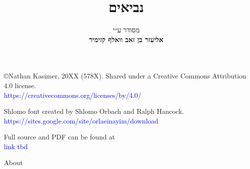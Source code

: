 \documentclass[twoside, openany, parskip=half, 11pt]{book}
\begin{document}
	
	\title{  נביאים \\
		
		\vspace{.5in}
	}
	
	\author{מסודר ע״י
		\\
		\textbf{אליעזר בן זאב וואלף קזימיר}}
	
	\maketitle
	
	\begin{minipage}{\textwidth}
		\begin{english}
			\raggedright
			
			©Nathan Kasimer, 20XX (578X). Shared under a Creative Commons Attribution 4.0 license.\\
			\textcolor{blue}{https://creativecommons.org/licenses/by/4.0/}\\ \vspace{\baselineskip}
			
			
			Shlomo font created by Shlomo Orbach and Ralph Hancock.\\ \textcolor{blue}{https://sites.google.com/site/orlaeinayim/download}\\ \vspace{\baselineskip}
			
			Full \XeLaTeX \quad source and PDF can be found at\\ \textcolor{blue}{link tbd}\\ \vspace{\baselineskip}
			
			
		\end{english}
	\end{minipage}
	
	\begin{minipage}{\textwidth}
		
		\begin{english}
			\begin{center} %
				\begin{LARGE}
					About
				\end{LARGE}
			\end{center}
			

			
			
		\end{english}
		
	\end{minipage}
	
\end{document}
